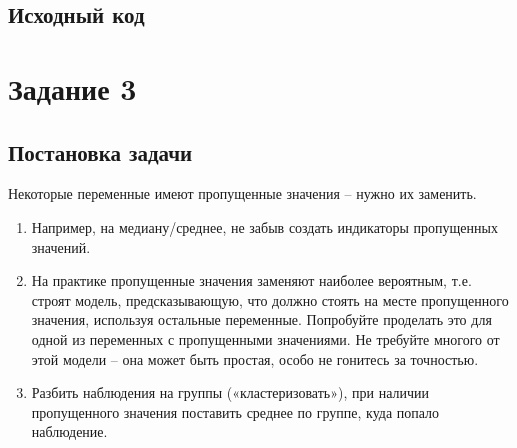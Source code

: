 \documentclass[12pt,a4paper]{article}
\begin{document}
  \subsection{Исходный код}
\begin{Shaded}
\begin{Highlighting}[]

\OperatorTok{=}\NormalTok{ data[}\NormalTok{]}
\OperatorTok{=}\OperatorTok{=}\NormalTok{)}
\OperatorTok{=}\OperatorTok{=}\OperatorTok{=}\NormalTok{)}
\end{Highlighting}
\end{Shaded}

  \newpage
  \section{Задание 3}
  \subsection{Постановка задачи}
  Некоторые переменные имеют пропущенные значения -- нужно их заменить.

  \begin{enumerate}
  \item
    Например, на медиану/среднее, не забыв создать индикаторы пропущенных
    значений.
  \item
    На практике пропущенные значения заменяют наиболее вероятным, т.е.
    строят модель, предсказывающую, что должно стоять на месте
    пропущенного значения, используя остальные переменные. Попробуйте
    проделать это для одной из переменных с пропущенными значениями. Не
    требуйте многого от этой модели -- она может быть простая, особо не
    гонитесь за точностью.
  \item
    Разбить наблюдения на группы («кластеризовать»), при наличии
    пропущенного значения поставить среднее по группе, куда попало
    наблюдение.
  \end{enumerate}
\end{document}
